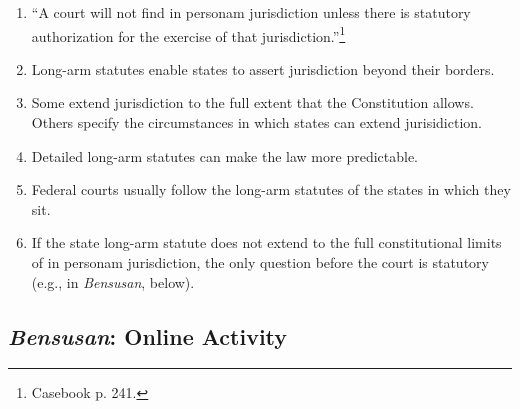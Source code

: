 \begin{enumerate}
    \item ``A court will not find in personam jurisdiction unless there is 
    statutory authorization for the exercise of that 
    jurisdiction.''\footnote{Casebook p. 241.}
    \item Long-arm statutes enable states to assert jurisdiction beyond their 
    borders.
    \item Some extend jurisdiction to the full extent that the Constitution 
    allows. Others specify the circumstances in which states can extend 
    jurisidiction.
    \item Detailed long-arm statutes can make the law more predictable.
    \item Federal courts usually follow the long-arm statutes of the states in 
    which they sit.
    \item If the state long-arm statute does not extend to the full 
    constitutional limits of in personam jurisdiction, the only question 
    before the court is statutory (e.g., in \emph{Bensusan}, below).

\end{enumerate}

\subsection{\emph{Bensusan}: Online Activity}

